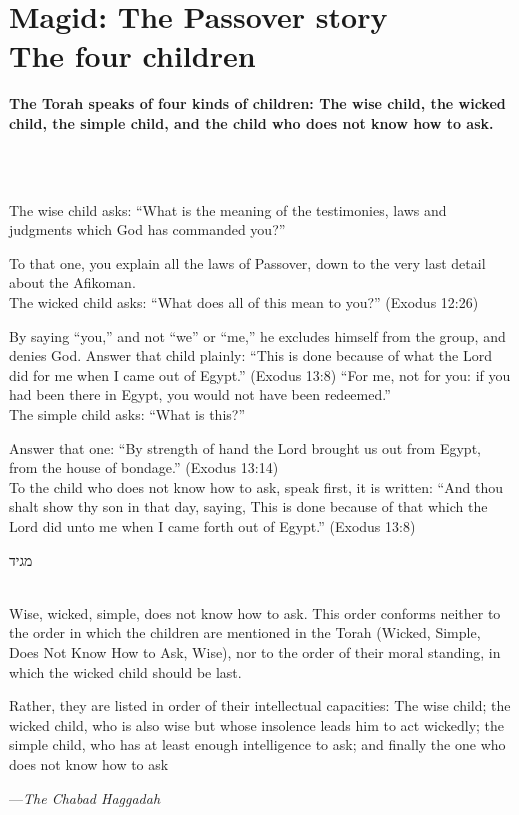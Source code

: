 \documentclass[a4paper,10pt,openany]{memoir}
\newcommand{\HgSource}[1]{\hfill{\small---\itshape{#1}}}
\newcommand{\hchapter}[1]{
  \begin{hebrew}
    \begin{Spacing}{.97}
      \newpage
      \strut

      \vspace{.15em}

      \noindent\Huge #1

      \vspace{1em}
    \end{Spacing}
  \end{hebrew}
}
\newcommand{\HgHL}[1]{{\Large\bfseries#1\par\noindent\\[-.5em]}}
\newenvironment{HgEnglish}{\strut\\\noindent}{\vspace{1em}}
\newcommand{\LSrc}{\textsuperscript{\upshape{[L]}}}
\begin{document}
\vfill

\chapter*{Magid: The Passover story \\ {\LARGE The four children}}

\vfill

\HgHL{The Torah speaks of four kinds of children: The wise child, the wicked
  child, the simple child, and the child who does not know how to ask.}\\
The wise child asks: ``What is the meaning of the testimonies, laws and
judgments which God has commanded you?''

To that one, you explain all the laws of Passover, down to the very last detail
about the Afikoman. \\[1em]
The wicked child asks: ``What does all of this mean to you?'' (Exodus 12:26)

By saying ``you,'' and not ``we'' or ``me,'' he excludes himself from the group,
and denies God. Answer that child plainly: ``This is done because of what the
Lord did for me when I came out of Egypt.'' (Exodus 13:8) ``For me, not for you:
if you had been there in Egypt, you would not have been redeemed.''\\[1em]
The simple child asks: ``What is this?'' 

Answer that one: ``By strength of hand the Lord brought us out from Egypt, from
the house of bondage.'' (Exodus 13:14)\\[1em]
To the child who does not know how to ask, speak first, it is written: ``And
thou shalt show thy son in that day, saying, This is done because of that which
the Lord did unto me when I came forth out of Egypt.'' (Exodus 13:8) \LSrc

\vfill

\hchapter{מגיד}

\begin{HgEnglish}
Wise, wicked, simple, does not know how to ask. This order conforms neither to
the order in which the children are mentioned in the Torah (Wicked, Simple, Does
Not Know How to Ask, Wise), nor to the order of their moral standing, in which
the wicked child should be last.

Rather, they are listed in order of their intellectual capacities: The wise
child; the wicked child, who is also wise but whose insolence leads him to act
wickedly; the simple child, who has at least enough intelligence to ask; and
finally the one who does not know how to ask

\HgSource{The Chabad Haggadah}
\end{HgEnglish}
\end{document}
